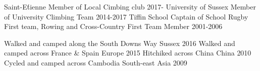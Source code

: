 \begin{cvhonors}
  \cvhonor
  {Saint-E\'tienne}
  {Member of Local Cimbing club}
  {}
  {2017-}
  \cvhonor
    {University of Sussex}
    {Member of University Climbing Team}
    {}
    {2014-2017}
  \cvhonor
    {Tiffin School}
    {Captain of School Rugby First team, Rowing and Cross-Country First Team Member}
    {}
    {2001-2006}
\end{cvhonors}

\begin{cvhonors}
  \cvhonor
    {Walked and camped along the South Downs Way}
    {}
    {Sussex}
    {2016}
  \cvhonor
    {Walked and camped across France \& Spain}
    {}
    {Europe}
    {2015}
 \cvhonor
    {Hitchiked across China}
    {}
    {China}
    {2010}
 \cvhonor
    {Cycled and camped across Cambodia}
    {}
    {South-east Asia}
    {2009}
\end{cvhonors}
